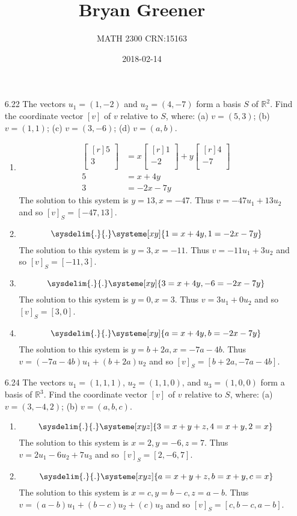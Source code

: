 \documentclass[12pt]{article}
\title{Bryan Greener}
\author{MATH 2300 CRN:15163}
\date{2018-02-14}
\theoremstyle{definition}
\theoremstyle{plain}
\begin{document}
\maketitle

\TabPositions{4cm}

\begin{enumerate}
\item[6.22] The vectors $u_1=(1,-2)$ and $u_2=(4,-7)$ form a basis $S$ of $\mathbb{R}^2$. Find the coordinate vector $[v]$ of $v$ relative to $S$, where: (a) $v=(5,3)$; (b) $v=(1,1)$; (c) $v=(3,-6)$; (d) $v=(a,b)$.
	\begin{enumerate}
	\item 
		\begin{align*}
		\begin{bmatrix}[r]5\\3\\\end{bmatrix} &= x\begin{bmatrix}[r]1\\-2\\\end{bmatrix}+y\begin{bmatrix}[r]4\\-7\\\end{bmatrix}\\
		5&=x+4y\\
		3&=-2x-7y
		\end{align*}
		The solution to this system is $y=13,x=-47$. Thus $v=-47u_1+13u_2$ and so $[v]_S=[-47,13]$.
	\item
		\[ \sysdelim{.}{.}\systeme[xy]{1=x+4y,1=-2x-7y} \]
		The solution to this system is $y=3,x=-11$. Thus $v=-11u_1+3u_2$ and so $[v]_S=[-11,3]$.
	\item
		\[ \sysdelim{.}{.}\systeme[xy]{3=x+4y,-6=-2x-7y} \]
		The solution to this system is $y=0,x=3$. Thus $v=3u_1+0u_2$ and so $[v]_S=[3,0]$.
	\item
		\[ \sysdelim{.}{.}\systeme[xy]{a=x+4y,b=-2x-7y} \]
		The solution to this system is $y=b+2a, x=-7a-4b$. Thus $v=(-7a-4b)u_1+(b+2a)u_2$ and so $[v]_S=[b+2a,-7a-4b]$.
	\end{enumerate}
	
\item[6.24] The vectors $u_1=(1,1,1)$, $u_2=(1,1,0)$, and $u_3=(1,0,0)$ form a basis of $\mathbb{R}^3$. Find the coordinate vector $[v]$ of $v$ relative to $S$, where: (a) $v=(3,-4,2)$; (b) $v=(a,b,c)$.
	\begin{enumerate}
	\item
		\[ \sysdelim{.}{.}\systeme[xyz]{3=x+y+z, \-4=x+y,2=x} \]
		The solution to this system is $x=2,y=-6,z=7$. Thus $v=2u_1-6u_2+7u_3$ and so $[v]_S=[2,-6,7]$.
	\item
		\[ \sysdelim{.}{.}\systeme[xyz]{a=x+y+z,b=x+y,c=x} \]
		The solution to this system is $x=c, y=b-c, z=a-b$. Thus $v=(a-b)u_1+(b-c)u_2+(c)u_3$ and so $[v]_S=[c,b-c,a-b]$.
	\end{enumerate}
	

\end{enumerate}
\end{document}
